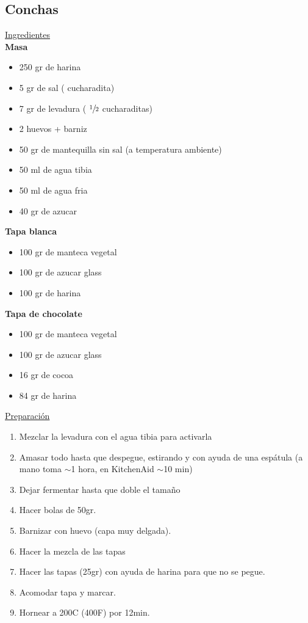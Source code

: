\subsection{Conchas}

\underline{Ingredientes}\\
\textbf{Masa}
\begin{itemize}
\item 250 gr de harina
\item 5 gr de sal ( cucharadita)
\item 7 gr de levadura ( $\sfrac{1}{2}$ cucharaditas)
\item 2 huevos +  barniz
\item 50 gr de mantequilla sin sal (a temperatura ambiente)
\item 50 ml de agua tibia
\item 50 ml de agua fria
\item 40 gr de azucar
\end{itemize}


\textbf{Tapa blanca}
\begin{itemize}
\item 100 gr de manteca vegetal
\item 100 gr de azucar glass
\item 100 gr de harina
\end{itemize}

\textbf{Tapa de chocolate}
\begin{itemize}
\item 100 gr de manteca vegetal
\item 100 gr de azucar glass
\item 16 gr de cocoa
\item 84 gr de harina
\end{itemize}

\underline{Preparaci\'on}

\begin{enumerate}
\item Mezclar la levadura con el agua tibia para activarla
\item Amasar todo hasta que despegue, estirando y con ayuda de una espátula (a mano toma $\sim$1 hora, en KitchenAid $\sim$10 min)
\item Dejar fermentar hasta que doble el tamaño
\item Hacer bolas de 50gr.
\item Barnizar con huevo (capa muy delgada).
\item Hacer la mezcla de las tapas
\item Hacer las tapas (25gr) con ayuda de harina para que no se pegue. 
\item Acomodar tapa y marcar.
\item Hornear a 200C (400F) por 12min.
\end{enumerate}
